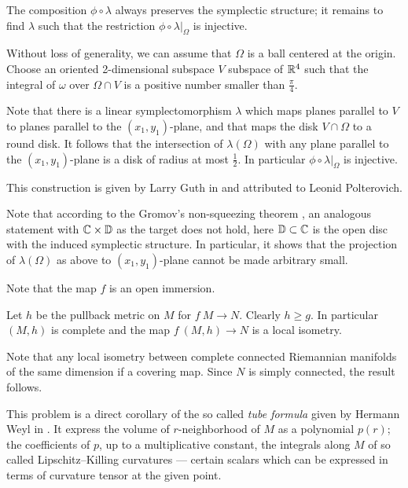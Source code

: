 \medskip

The composition $\phi\circ\lambda$ always preserves the symplectic structure;
it remains to find $\lambda$ such that the restriction $\phi\circ\lambda|_\Omega$
is injective.

Without loss of generality,
we can assume that $\Omega$ is a ball centered at the origin.
Choose an oriented 2-dimensional subspace $V$ subspace of $\mathbb{R}^4$ 
such that the integral of $\omega$ over 
$\Omega\cap V$ is a  positive number smaller than $\tfrac\pi4$. 

Note that there is a linear symplectomorphism $\lambda$
 which maps planes parallel to $V$ to planes
parallel to the $(x_1,y_1)$-plane, 
and that maps the disk $V\cap\Omega$ to a round disk.
It follows that the intersection of $\lambda(\Omega)$ 
with any plane parallel to the $(x_1,y_1)$-plane is a disk of radius at most $\tfrac 12$.
In particular $\phi\circ\lambda|_\Omega$
is injective.\qeds

This construction is given 
by Larry Guth in \cite{guth-symplectic}
and attributed to Leonid Polterovich.

Note that according to the Gromov's non-squeezing theorem \cite[see][]{gromov-pseudoholomorphic}, 
an analogous statement with $\mathbb{C}\times \mathbb{D}$ as the target does not hold, here $\mathbb{D}\subset \mathbb{C}$ is the open disc with the induced symplectic structure.
In particular, it shows that
the projection of $\lambda(\Omega)$ as above 
to $(x_1,y_1)$-plane
cannot be made arbitrary small.

Note that the map $f$ is an open immersion.

Let $h$ be the pullback metric on $M$ for $f\:M\to N$.
Clearly $h\ge g$.
In particular $(M,h)$ is complete and the map $f\:(M,h)\to N$ is a local isometry. 

Note that any local isometry between complete connected Riemannian manifolds of the same dimension if a covering map.
Since $N$ is simply connected, the result follows.
\qeds 


This problem is a direct corollary of the so called \emph{tube formula} given by Hermann Weyl in \cite{weyl}.
It express the volume of $r$-neighborhood of $M$ as a polynomial $p(r)$;
the coefficients of $p$, up to a multiplicative constant, the integrals along $M$ of so called Lipschitz--Killing curvatures --- certain scalars which can be expressed in terms of curvature tensor at the given point.
 

